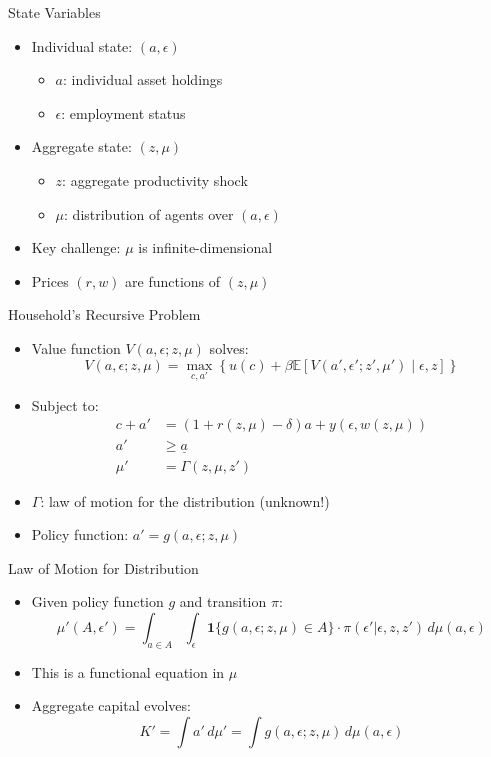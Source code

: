 \documentclass[aspectratio=169]{beamer}
\newcommand{\E}{\mathbb{E}}
\newcommand{\1}{\mathbf{1}}
\begin{document}
\begin{frame}{State Variables}
  \begin{itemize}
      \item Individual state: $(a, \epsilon)$
      \begin{itemize}
          \item $a$: individual asset holdings
          \item $\epsilon$: employment status
      \end{itemize}
      \item Aggregate state: $(z, \mu)$
      \begin{itemize}
          \item $z$: aggregate productivity shock
          \item $\mu$: distribution of agents over $(a, \epsilon)$
      \end{itemize}
      \item Key challenge: $\mu$ is infinite-dimensional
      \item Prices $(r, w)$ are functions of $(z, \mu)$
  \end{itemize}
\end{frame}

\begin{frame}{Household's Recursive Problem}
  \small
  \begin{itemize}
      \item Value function $V(a, \epsilon; z, \mu)$ solves:
      \[
      V(a, \epsilon; z, \mu) = \max_{c, a'} \left\{ u(c) + \beta \E \left[ V(a', \epsilon'; z', \mu') \mid \epsilon, z \right] \right\}
      \]
      \item Subject to:
      \begin{align*}
      c + a' &= (1 + r(z, \mu) - \delta) a + y(\epsilon, w(z, \mu)) \\
      a' &\geq \underline{a} \\
      \mu' &= \Gamma(z, \mu, z')
      \end{align*}
      \item $\Gamma$: law of motion for the distribution (unknown!)
      \item Policy function: $a' = g(a, \epsilon; z, \mu)$
  \end{itemize}
\end{frame}

\begin{frame}{Law of Motion for Distribution}
  \begin{itemize}
      \item Given policy function $g$ and transition $\pi$:
      \[
      \mu'(A, \epsilon') = \int_{a \in A} \int_{\epsilon} \mathbf{1}\{g(a, \epsilon; z, \mu) \in A\} \cdot \pi(\epsilon' | \epsilon, z, z') \, d\mu(a, \epsilon)
      \]
      \item This is a functional equation in $\mu$
      \item Aggregate capital evolves:
      \[
      K' = \int a' \, d\mu' = \int g(a, \epsilon; z, \mu) \, d\mu(a, \epsilon)
      \]
  \end{itemize}
\end{frame}
\end{document}
